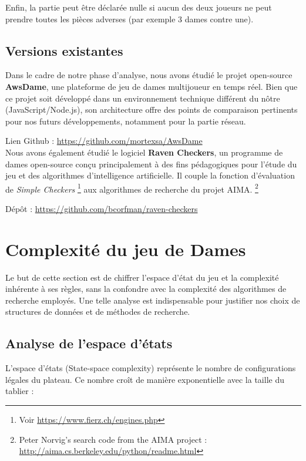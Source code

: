 \documentclass[11pt,a4paper]{article}
\begin{document}
Enfin, la partie peut être déclarée nulle si aucun des deux joueurs ne peut prendre toutes les pièces adverses (par exemple 3 dames contre une).

\subsection{Versions existantes}

Dans le cadre de notre phase d'analyse, nous avons étudié le projet open-source \textbf{AwsDame}, une plateforme de jeu de dames multijoueur en temps réel. Bien que ce projet soit développé dans un environnement technique différent du nôtre (JavaScript/Node.js), son architecture offre des points de comparaison pertinents pour nos futurs développements, notamment pour la partie réseau.

Lien Github : \url{https://github.com/mortexsa/AwsDame}\\


\noindent Nous avons également étudié le logiciel \textbf{Raven Checkers}, un programme de dames open-source conçu principalement à des fins pédagogiques pour l'étude du jeu et des algorithmes d'intelligence artificielle. Il couple la fonction d'évaluation de \textit{Simple Checkers}
\footnote{Voir \url{https://www.fierz.ch/engines.php}} aux algorithmes de recherche du projet AIMA. \footnote{Peter Norvig's search code from the AIMA project : \url{http://aima.cs.berkeley.edu/python/readme.html}}

Dépôt : \url{https://github.com/bcorfman/raven-checkers}

\section{Complexité du jeu de Dames}

Le but de cette section est de chiffrer l'espace d'état du jeu et la complexité inhérente à ses règles, sans la confondre avec la complexité des algorithmes de recherche employés. Une telle analyse est indispensable pour justifier nos choix de structures de données et de méthodes de recherche.

\subsection{Analyse de l'espace d'états}

L'espace d'états (State-space complexity) représente le nombre de configurations légales du plateau. Ce nombre croît de manière exponentielle avec la taille du tablier :
\end{document}
